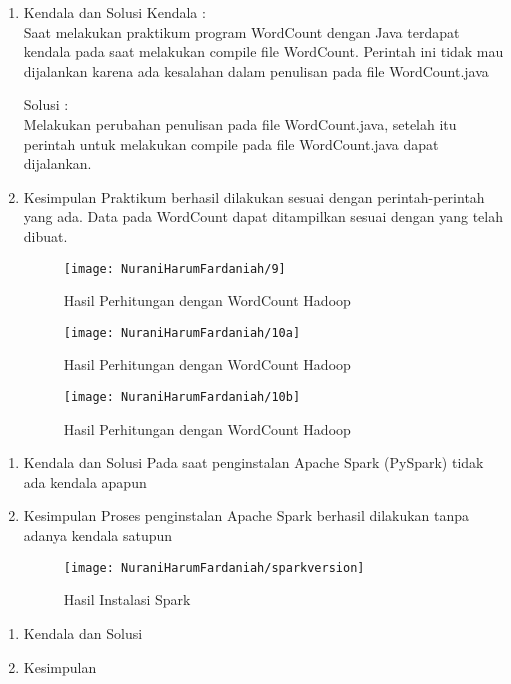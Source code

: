 \begin{enumerate}
\item Kendala dan Solusi
\newline Kendala :\\
Saat melakukan praktikum program WordCount dengan Java terdapat kendala pada saat melakukan compile file WordCount. Perintah ini tidak mau dijalankan karena ada kesalahan dalam penulisan pada file WordCount.java

Solusi :\\
Melakukan perubahan penulisan pada file WordCount.java, setelah itu perintah untuk melakukan compile pada file WordCount.java dapat dijalankan.

\item Kesimpulan
\newline Praktikum berhasil dilakukan sesuai dengan perintah-perintah yang ada. Data pada WordCount dapat ditampilkan sesuai dengan yang telah dibuat.


\begin{figure}[!ht]
\texttt{[image: NuraniHarumFardaniah/9]}
\caption{Hasil Perhitungan dengan WordCount Hadoop}
\label{gam:perkuliahan-25-11}
\end{figure}

\begin{figure}[!ht]
\texttt{[image: NuraniHarumFardaniah/10a]}
\caption{Hasil Perhitungan dengan WordCount Hadoop}
\label{gam:perkuliahan-25-11}
\end{figure}
\newpage
\begin{figure}[!ht]
\texttt{[image: NuraniHarumFardaniah/10b]}
\caption{Hasil Perhitungan dengan WordCount Hadoop}
\label{gam:perkuliahan-25-11}
\end{figure}

\end{enumerate}

\begin{enumerate}
\item Kendala dan Solusi
\newline Pada saat penginstalan Apache Spark (PySpark) tidak ada kendala apapun

\item Kesimpulan
\newline Proses penginstalan Apache Spark berhasil dilakukan tanpa adanya kendala satupun
\newpage
\begin{figure}[!ht]
\texttt{[image: NuraniHarumFardaniah/sparkversion]}
\caption{Hasil Instalasi Spark}
\label{gam:perkuliahan-25-11}
\end{figure}

\end{enumerate}

\begin{enumerate}
\item Kendala dan Solusi

\item Kesimpulan

\end{enumerate}
